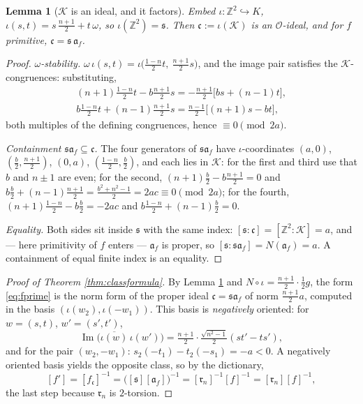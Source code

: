 \documentclass[11pt]{amsart}
\numberwithin{equation}{section}
\theoremstyle{plain}
\newtheorem{lemma}[theorem]{Lemma}
\theoremstyle{definition}
\theoremstyle{remark}
\newcommand{\Z}{\mathbb{Z}}
\newcommand{\im}{\operatorname{Im}}
\newcommand{\ideala}{\mathfrak{a}}
\newcommand{\idealc}{\mathfrak{c}}
\newcommand{\idealr}{\mathfrak{r}}
\newcommand{\ideals}{\mathfrak{s}}
\begin{document}
\begin{lemma}[$\mathcal{K}$ is an ideal, and it factors]
\label{lem:lemmaC}
Embed $\iota: \Z^2 \hookrightarrow K$,
$\iota(s, t) = s\,\tfrac{n+1}{2} + t\,\omega$, so
$\iota(\Z^2) = \ideals$.  Then $\idealc := \iota(\mathcal{K})$ is an
$\mathcal{O}$-ideal, and for $f$ primitive,
$\idealc = \ideals\,\ideala_f$.
\end{lemma}

\begin{proof}
\emph{$\omega$-stability.}  $\omega\,\iota(s, t) =
\iota\bigl(\tfrac{1-n}{2}t,\ \tfrac{n+1}{2}s\bigr)$, and the image pair
satisfies the $\mathcal{K}$-congruences: substituting,
\begin{gather*}
  (n+1)\tfrac{1-n}{2}t - b\tfrac{n+1}{2}s
  = -\tfrac{n+1}{2}\bigl[bs + (n-1)t\bigr],\\
  b\tfrac{1-n}{2}t + (n-1)\tfrac{n+1}{2}s
  = \tfrac{n-1}{2}\bigl[(n+1)s - bt\bigr],
\end{gather*}
both multiples of the defining congruences, hence
$\equiv 0 \pmod{2a}$.

\emph{Containment $\ideals\ideala_f \subseteq \idealc$.}  The four
generators of $\ideals\ideala_f$ have $\iota$-coordinates
$(a, 0)$, $(\tfrac b2, \tfrac{n+1}{2})$, $(0, a)$,
$(\tfrac{1-n}{2}, \tfrac b2)$, and each lies in $\mathcal{K}$: for the
first and third use that $b$ and $n \pm 1$ are even; for the second,
$(n+1)\tfrac b2 - b\tfrac{n+1}{2} = 0$ and $b\tfrac b2 +
(n-1)\tfrac{n+1}{2} = \tfrac{b^2 + n^2 - 1}{2} = 2ac \equiv 0
\pmod{2a}$; for the fourth, $(n+1)\tfrac{1-n}{2} - b\tfrac b2 = -2ac$
and $b\tfrac{1-n}{2} + (n-1)\tfrac b2 = 0$.

\emph{Equality.}  Both sides sit inside $\ideals$ with the same index:
$[\ideals : \idealc] = [\Z^2 : \mathcal{K}] = a$, and --- here
primitivity of $f$ enters --- $\ideala_f$ is proper, so
$[\ideals : \ideals\ideala_f] = N(\ideala_f) = a$.  A containment of
equal finite index is an equality.
\end{proof}

\begin{proof}[Proof of Theorem \ref{thm:classformula}]
By Lemma \ref{lem:lemmaC} and $N \circ \iota = \tfrac{n+1}{2}\cdot
\tfrac12 g$, the form \eqref{eq:fprime} is the norm form of the proper
ideal $\idealc = \ideals\ideala_f$ of norm $\tfrac{n+1}{2}a$, computed
in the basis $(\iota(w_2), \iota(-w_1))$.  This basis is
\emph{negatively} oriented: for $w = (s, t)$, $w' = (s', t')$,
\[
  \im\bigl(\overline{\iota(w)}\,\iota(w')\bigr)
  = \tfrac{n+1}{2}\cdot\tfrac{\sqrt{n^2 - 1}}{2}(st' - ts'),
\]
and for the pair $(w_2, -w_1)$: $s_2(-t_1) - t_2(-s_1) = -a < 0$.  A
negatively oriented basis yields the opposite class, so by the
dictionary,
\[
  [f'] = [f_{\idealc}]^{-1} = \bigl([\ideals][\ideala_f]\bigr)^{-1}
  = [\idealr_n]^{-1}[f]^{-1} = [\idealr_n][f]^{-1},
\]
the last step because $\idealr_n$ is $2$-torsion.
\end{proof}
\end{document}
